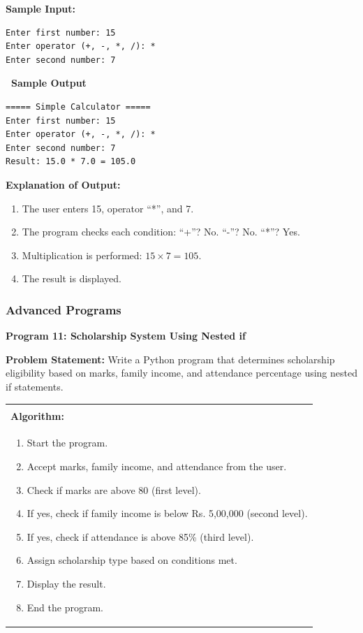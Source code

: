 \documentclass[12pt,a4paper]{article}
\makeatletter
\newcommand{\outhead}{\noindent\colorbox{cmrgreen!25}%
  {\textbf{\small\color{cmrdark}~Sample Output~}}\par\vspace{-1pt}}
\newenvironment{algobox}{%
  \par\vspace{4pt}%
  \noindent\begin{tabular}{@{}p{\linewidth}@{}}%
  \hline\\[-8pt]%
  \textbf{\color{blue!60!black}\small Algorithm:}\\[2pt]%
}{%
  \\[-4pt]\hline%
  \end{tabular}\par\vspace{4pt}%
}
\makeatother
\begin{document}
\textbf{Sample Input:}
\begin{verbatim}
Enter first number: 15
Enter operator (+, -, *, /): *
Enter second number: 7
\end{verbatim}

\outhead
\begin{lstlisting}[style=outputstyle]
===== Simple Calculator =====
Enter first number: 15
Enter operator (+, -, *, /): *
Enter second number: 7
Result: 15.0 * 7.0 = 105.0
\end{lstlisting}

\textbf{Explanation of Output:}
\begin{enumerate}
  \item The user enters 15, operator ``*'', and 7.
  \item The program checks each condition: ``+''? No. ``-''? No. ``*''? Yes.
  \item Multiplication is performed: $15 \times 7 = 105$.
  \item The result is displayed.
\end{enumerate}

\subsubsection{Advanced Programs}

\textbf{Program 11: Scholarship System Using Nested if}

\textbf{Problem Statement:}
Write a Python program that determines scholarship eligibility based on marks, family income, and attendance percentage using nested if statements.

\begin{algobox}
\begin{enumerate}[label=Step \arabic*:]
  \item Start the program.
  \item Accept marks, family income, and attendance from the user.
  \item Check if marks are above 80 (first level).
  \item If yes, check if family income is below Rs. 5,00,000 (second level).
  \item If yes, check if attendance is above 85\% (third level).
  \item Assign scholarship type based on conditions met.
  \item Display the result.
  \item End the program.
\end{enumerate}
\end{algobox}
\end{document}
